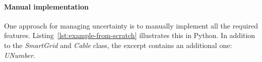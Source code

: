 \paragraph{Manual implementation} 
%
%
%

One approach for managing uncertainty is to manually implement all the required features.
Listing~\ref{lst:example-from-scratch} illustrates this in Python.
In addition to the \textit{SmartGrid} and \textit{Cable} class, the excerpt contains an additional one: \textit{UNumber}.

